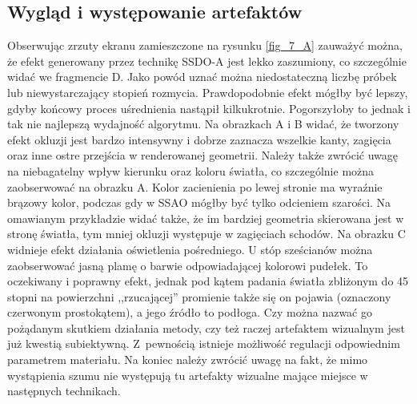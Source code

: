 		\subsection{Wygląd i występowanie artefaktów}
		\label{t:wnioski:porownanie:wyglad}
		
		
		Obserwując zrzuty ekranu zamieszczone na rysunku \ref{fig_7_A} zauważyć można, że efekt generowany przez technikę SSDO-A jest lekko zaszumiony, co szczególnie widać we fragmencie D. Jako powód uznać można niedostateczną liczbę próbek lub niewystarczający stopień rozmycia. Prawdopodobnie efekt mógłby być lepszy, gdyby końcowy proces uśrednienia nastąpił kilkukrotnie. Pogorszyłoby to jednak i tak nie najlepszą wydajność algorytmu. Na obrazkach A i B widać, że tworzony efekt okluzji jest bardzo intensywny i dobrze zaznacza wszelkie kanty, zagięcia oraz inne ostre przejścia w renderowanej geometrii. Należy także zwrócić uwagę na niebagatelny wpływ kierunku oraz koloru światła, co szczególnie można zaobserwować na obrazku A. Kolor zacienienia po lewej stronie ma wyraźnie brązowy kolor, podczas gdy w SSAO mógłby być tylko odcieniem szarości. Na omawianym przykładzie widać także, że im bardziej geometria skierowana jest w stronę światła, tym mniej okluzji występuje w zagięciach schodów. Na obrazku C widnieje efekt działania oświetlenia pośredniego. U stóp sześcianów można zaobserwować jasną plamę o barwie odpowiadającej kolorowi pudełek. To oczekiwany i poprawny efekt, jednak pod kątem padania światła zbliżonym do 45 stopni na powierzchni ,,rzucającej'' promienie także się on pojawia (oznaczony czerwonym prostokątem), a jego źródło to podłoga. Czy można nazwać go pożądanym skutkiem działania metody, czy też raczej artefaktem wizualnym jest już kwestią subiektywną. Z~pewnością istnieje możliwość regulacji odpowiednim parametrem materiału. Na koniec należy zwrócić uwagę na fakt, że mimo wystąpienia szumu nie występują tu artefakty wizualne mające miejsce w następnych technikach.
		
